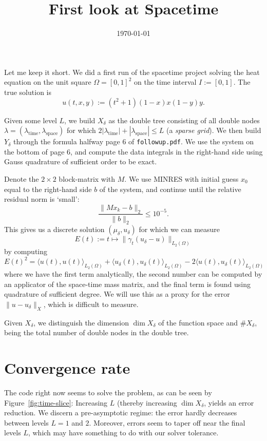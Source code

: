\documentclass[11pt,a4paper]{amsart}
\date{\today}
\theoremstyle{definition}
\newcommand{\inp}[2]{\langle #1, #2 \rangle}
\begin{document}
\title{First look at Spacetime}
\maketitle

Let me keep it short. We did a first run of the spacetime project solving the
heat equation on the unit square $\Omega = [0,1]^2$ on the time interval
$I := [0,1]$. The true solution is 
\[
  u(t,x,y) := (t^2 + 1) (1-x)x(1-y)y.
\]

Given some level $L$, we build $X_\delta$ as the double tree consisting of all
double nodes $\lambda = (\lambda_{\text{time}}, \lambda_{\text{space}})$ for
which $2|\lambda_{\text{time}}| + |\lambda_{\text{space}}| \leq L$ (a \emph{sparse grid}).
We then build $Y_\delta$ through the formula halfway page 6 of \texttt{followup.pdf}.
We use the system on the bottom of page 6, and compute the data integrals in the
right-hand side using Gauss quadrature of sufficient order to be exact.

Denote the $2 \times 2$ block-matrix with $M$. We use MINRES with initial guess $x_0$
equal to the right-hand side $b$ of the system, and continue until the relative residual norm is `small':
\[
  \frac{\|Mx_k - b\|_2}{\|b\|_2} \leq 10^{-5}.
\]
This gives us a discrete solution $(\mu_\delta, u_\delta)$ for which we can measure
\[
  E(t) := t \mapsto \|\gamma_t(u_\delta - u)\|_{L_2(\Omega)}
\]
by computing
\[
  E(t)^2 = \inp{u(t)}{u(t)}_{L_2(\Omega)} + \inp{u_\delta(t)}{u_\delta(t)}_{L_2(\Omega)} - 2 \inp{u(t)}{u_\delta(t)}_{L_2(\Omega)}
\]
where we have the first term analytically, the second number can be computed by
an applicator of the space-time mass matrix, and the final term is found
using quadrature of sufficient degree. We will use this as a proxy for the error
$\|u - u_\delta\|_X$, which is difficult to measure.

Given $X_\delta$, we distinguish the dimension $\dim X_\delta$ of the function space
and $\# X_\delta$, being the total number of double nodes in the double tree.

\section*{Convergence rate}
The code right now seems to solve the problem, as can be seen by Figure~\ref{fig:time-slice}:
Increasing $L$ (thereby increasing $\dim X_\delta$, yields an error reduction.
We discern a pre-asymptotic regime: the error hardly decreases between levels $L=1$
and $2$. Moreover, errors seem to taper off near the final levels $L$, which may
have something to do with our solver tolerance.
\end{document}
